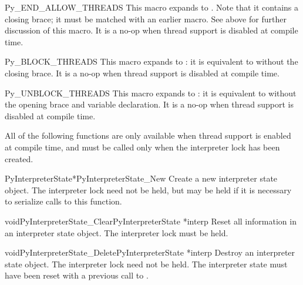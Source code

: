 \begin{csimplemacrodesc}{Py_END_ALLOW_THREADS}
  This macro expands to .
  Note that it contains a closing brace; it must be matched with an
  earlier  macro.  See above for
  further discussion of this macro.  It is a no-op when thread support
  is disabled at compile time.
\end{csimplemacrodesc}

\begin{csimplemacrodesc}{Py_BLOCK_THREADS}
  This macro expands to : it is
  equivalent to  without the
  closing brace.  It is a no-op when thread support is disabled at
  compile time.
\end{csimplemacrodesc}

\begin{csimplemacrodesc}{Py_UNBLOCK_THREADS}
  This macro expands to : it is
  equivalent to  without the
  opening brace and variable declaration.  It is a no-op when thread
  support is disabled at compile time.
\end{csimplemacrodesc}

All of the following functions are only available when thread support
is enabled at compile time, and must be called only when the
interpreter lock has been created.

\begin{cfuncdesc}{PyInterpreterState*}{PyInterpreterState_New}{}
  Create a new interpreter state object.  The interpreter lock need
  not be held, but may be held if it is necessary to serialize calls
  to this function.
\end{cfuncdesc}

\begin{cfuncdesc}{void}{PyInterpreterState_Clear}{PyInterpreterState *interp}
  Reset all information in an interpreter state object.  The
  interpreter lock must be held.
\end{cfuncdesc}

\begin{cfuncdesc}{void}{PyInterpreterState_Delete}{PyInterpreterState *interp}
  Destroy an interpreter state object.  The interpreter lock need not
  be held.  The interpreter state must have been reset with a previous
  call to .
\end{cfuncdesc}

